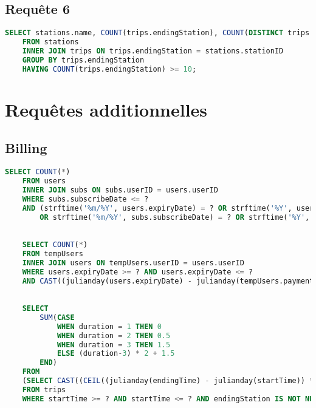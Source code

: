 \documentclass[a4paper,11pt]{report}
\begin{document}
\section{Requ\^ete 6}
    \begin{lstlisting}[language=sql]
    SELECT stations.name, COUNT(trips.endingStation), COUNT(DISTINCT trips.userID)
    FROM stations
    INNER JOIN trips ON trips.endingStation = stations.stationID
    GROUP BY trips.endingStation
    HAVING COUNT(trips.endingStation) >= 10;
    \end{lstlisting}

\chapter{Requ\^etes additionnelles}

    \section{Billing}
    \begin{lstlisting}[language=sql]
    SELECT COUNT(*) 
    FROM users
    INNER JOIN subs ON subs.userID = users.userID
    WHERE subs.subscribeDate <= ?
    AND (strftime('%m/%Y', users.expiryDate) = ? OR strftime('%Y', users.expiryDate) = ?) 
        OR strftime('%m/%Y', subs.subscribeDate) = ? OR strftime('%Y', subs.subscribeDate) = ?
    \end{lstlisting}

    \begin{lstlisting}[language=sql]

    SELECT COUNT(*)
    FROM tempUsers
    INNER JOIN users ON tempUsers.userID = users.userID
    WHERE users.expiryDate >= ? AND users.expiryDate <= ?
    AND CAST((julianday(users.expiryDate) - julianday(tempUsers.paymentDate)) AS INTEGER) == ?
    \end{lstlisting}

    \begin{lstlisting}[language=sql]

    SELECT
        SUM(CASE 
            WHEN duration = 1 THEN 0 
            WHEN duration = 2 THEN 0.5 
            WHEN duration = 3 THEN 1.5 
            ELSE (duration-3) * 2 + 1.5 
        END)
    FROM 
    (SELECT CAST((CEIL((julianday(endingTime) - julianday(startTime)) * 48.0)) AS INTEGER) AS duration
    FROM trips
    WHERE startTime >= ? AND startTime <= ? AND endingStation IS NOT NULL AND endingTime IS NOT NULL)
    \end{lstlisting}
\end{document}

